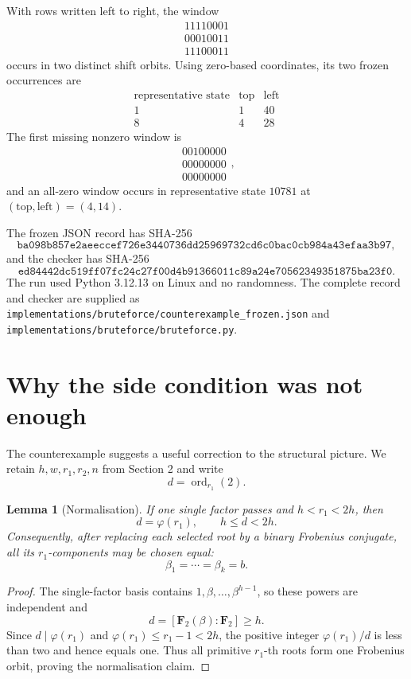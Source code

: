 \documentclass[11pt]{article}
\newtheorem{lemma}[theorem]{Lemma}
\newcommand{\F}{\mathbf F}
\newcommand{\ord}{\operatorname{ord}}
\begin{document}
With rows written left to right, the window
\[
\begin{array}{c}
11110001\\
00010011\\
11100011
\end{array}
\]
occurs in two distinct shift orbits.  Using zero-based coordinates, its
two frozen occurrences are
\[
\begin{array}{c|cc}
\text{representative state}&\text{top}&\text{left}\\ \hline
1&1&40\\
8&4&28
\end{array}
\]
The first missing nonzero window is
\[
\begin{array}{c}
00100000\\
00000000\\
00000000
\end{array},
\]
and an all-zero window occurs in representative state \(10781\) at
\((\text{top},\text{left})=(4,14)\).

The frozen JSON record has SHA-256
\[
\mathtt{ba098b857e2aeeccef726e3440736dd25969732cd6c0bac0cb984a43efaa3b97},
\]
and the checker has SHA-256
\[
\mathtt{ed84442dc519ff07fc24c27f00d4b91366011c89a24e70562349351875ba23f0}.
\]
The run used Python 3.12.13 on Linux and no randomness.  The complete
record and checker are supplied as
\nolinkurl{implementations/bruteforce/counterexample_frozen.json} and
\nolinkurl{implementations/bruteforce/bruteforce.py}.

\section{Why the side condition was not enough}

The counterexample suggests a useful correction to the structural picture.
We retain \(h,w,r_1,r_2,n\) from Section 2 and write
\[
 d=\ord_{r_1}(2).
\]

\begin{lemma}[Normalisation]
\label{lem:normalisation}
If one single factor passes and \(h<r_1<2h\), then
\[
 d=\varphi(r_1),\qquad h\leq d<2h.
\]
Consequently, after replacing each selected root by a binary Frobenius
conjugate, all its \(r_1\)-components may be chosen equal:
\[
 \beta_1=\cdots=\beta_k=b.
\]
\end{lemma}

\begin{proof}
The single-factor basis contains
\(1,\beta,\ldots,\beta^{h-1}\), so these powers are independent and
\[
 d=[\F_2(\beta):\F_2]\geq h.
\]
Since \(d\mid\varphi(r_1)\) and
\(\varphi(r_1)\leq r_1-1<2h\), the positive integer
\(\varphi(r_1)/d\) is less than two and hence equals one.
Thus all primitive \(r_1\)-th roots form one Frobenius orbit, proving the
normalisation claim.
\end{proof}
\end{document}
